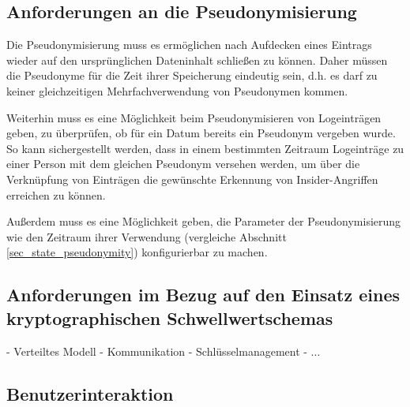 \subsection*{Anforderungen an die Pseudonymisierung}


Die Pseudonymisierung muss es ermöglichen nach Aufdecken eines Eintrags wieder auf den ursprünglichen Dateninhalt schließen zu können. Daher müssen die Pseudonyme für die Zeit ihrer Speicherung eindeutig sein, d.h. es darf zu keiner gleichzeitigen Mehrfachverwendung von Pseudonymen kommen. 

Weiterhin muss es eine Möglichkeit beim Pseudonymisieren von Logeinträgen geben, zu überprüfen, ob für ein Datum bereits ein Pseudonym vergeben wurde. So kann sichergestellt werden, dass in einem bestimmten Zeitraum Logeinträge zu einer Person mit dem gleichen Pseudonym versehen werden, um über die Verknüpfung von Einträgen die gewünschte Erkennung von Insider-Angriffen erreichen zu können.

Außerdem muss es eine Möglichkeit geben, die Parameter der Pseudonymisierung wie den Zeitraum ihrer Verwendung (vergleiche Abschnitt \ref{sec_state_pseudonymity}) konfigurierbar zu machen.

\subsection*{Anforderungen im Bezug auf den Einsatz eines kryptographischen Schwellwertschemas}

- Verteiltes Modell 
- Kommunikation
- Schlüsselmanagement
- ...

\subsection*{Benutzerinteraktion}




